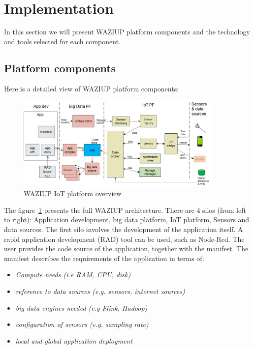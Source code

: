 
\section{Implementation}
\label{sec:implem}

In this section we will present WAZIUP platform components and the technology and tools selected for each component.

\subsection{Platform components}
Here is a detailed view of WAZIUP platform components:

\begin{figure}[h!]
\centering
\includegraphics[width=0.9\textwidth]{figs/platformOverview.png}
\caption{WAZIUP IoT platform overview}
\label{fig:platformOverview}
\end{figure}

The figure~\ref{fig:platformOverview} presents the full WAZIUP architecture. 
There are 4 silos (from left to right): Application development, big data platform, IoT platform, Sensors and data sources. 
The first silo involves the development of the application itself. 
A rapid application development (RAD) tool can be used, such as Node-Red. 
The user provides the code source of the application, together with the manifest. 
The manifest describes the requirements of the application in terms of:
\begin{itemize}
	\item \emph{Compute needs (i.e RAM, CPU, disk)}
	\item \emph{reference to data sources (e.g. sensors, internet sources)}
	\item \emph{big data engines needed (e.g Flink, Hadoop)}
	\item \emph{configuration of sensors (e.g. sampling rate)}
	\item \emph{local and global application deployment}
\end{itemize}

